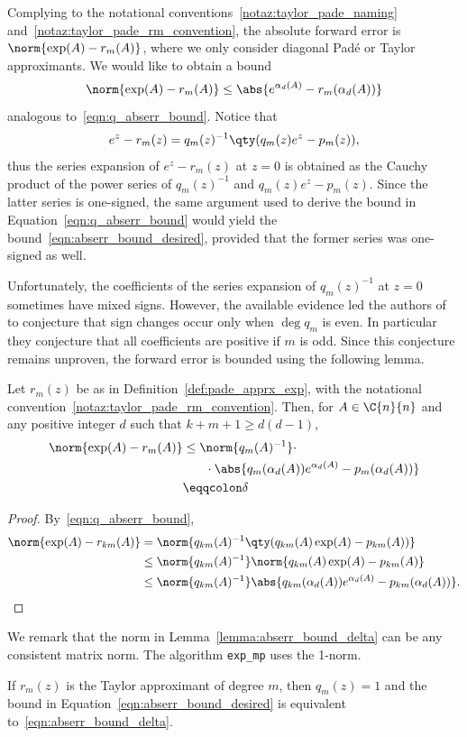 Complying to the notational conventions~\ref{notaz:taylor_pade_naming} and~\ref{notaz:taylor_pade_rm_convention}, the absolute forward error is $\norm{\exp(A)-r_{m}(A)}$, where we only consider diagonal Padé or Taylor approximants. We would like to obtain a bound 
\begin{equation}\label{eqn:abserr_bound_desired}
	\norm{\exp(A)-r_{m}(A)}\le\abs{e^{\alpha_d(A)}-r_{m}(\alpha_d(A))}
\end{equation}
analogous to~\eqref{eqn:q_abserr_bound}. Notice that 
\[
	e^z-r_{m}(z)=q_{m}(z)^{-1}\qty(q_{m}(z)e^z-p_{m}(z)),
\]
thus the series expansion of $e^z-r_{m}(z)$ at $z=0$ is obtained as the Cauchy product of the power series of $q_{m}(z)^{-1}$ and $q_{m}(z)e^z-p_{m}(z)$. Since the latter series is one-signed, the same argument used to derive the bound in Equation~\eqref{eqn:q_abserr_bound} would yield the bound~\eqref{eqn:abserr_bound_desired}, provided that the former series was one-signed as well.

Unfortunately, the coefficients of the series expansion of $q_{m}(z)^{-1}$ at $z=0$ sometimes have mixed signs. However, the available evidence led the authors of~\cite{higham:hf19_mpexpm} to conjecture that sign changes occur only when $\deg q_{m}$ is even. In particular they conjecture that all coefficients are positive if $m$ is odd. Since this conjecture remains unproven, the forward error is bounded using the following lemma.
\begin{lemma}\label{lemma:abserr_bound_delta}
	Let $r_{m}(z)$ be as in Definition~\ref{def:pade_apprx_exp}, with the notational convention~\ref{notaz:taylor_pade_rm_convention}. Then, for $A\in\C{n}{n}$ and any positive integer $d$ such that $k+m+1\ge d(d-1)$,
	\begin{equation}\label{eqn:abserr_bound_delta}
	\begin{aligned}
		\norm{\exp(A)-r_{m}(A)} &\le \norm{q_{m}(A)^{-1}}\cdot\\
		 & \phantom{\le}\quad\cdot\abs{q_{m}(\alpha_d(A))e^{\alpha_d(A)}-p_{m}(\alpha_d(A))}\\
		 & \eqqcolon\delta
	\end{aligned}
	\end{equation}
\end{lemma}
\begin{proof}
	By~\eqref{eqn:q_abserr_bound},
	\begin{align*}
		\norm{\exp(A)-r_{km}(A)} &= \norm{q_{km}(A)^{-1}\qty(q_{km}(A)\exp(A)-p_{km}(A))}\\
		 & \le\norm{q_{km}(A)^{-1}}\norm{q_{km}(A)\exp(A)-p_{km}(A)}\\
		 & \le\norm{q_{km}(A)^{-1}}\abs{q_{km}(\alpha_d(A))e^{\alpha_d(A)}-p_{km}(\alpha_d(A))}.\qedhere
	\end{align*}
\end{proof}
We remark that the norm in Lemma~\ref{lemma:abserr_bound_delta} can be any consistent matrix norm. The algorithm \texttt{exp\_mp} uses the 1-norm.
\begin{oss}\label{oss:taylor_bounds_equivalent}
	If $r_m(z)$ is the Taylor approximant of degree $m$, then $q_m(z)=1$ and the bound in Equation~\eqref{eqn:abserr_bound_desired} is equivalent to~\eqref{eqn:abserr_bound_delta}.
\end{oss}

